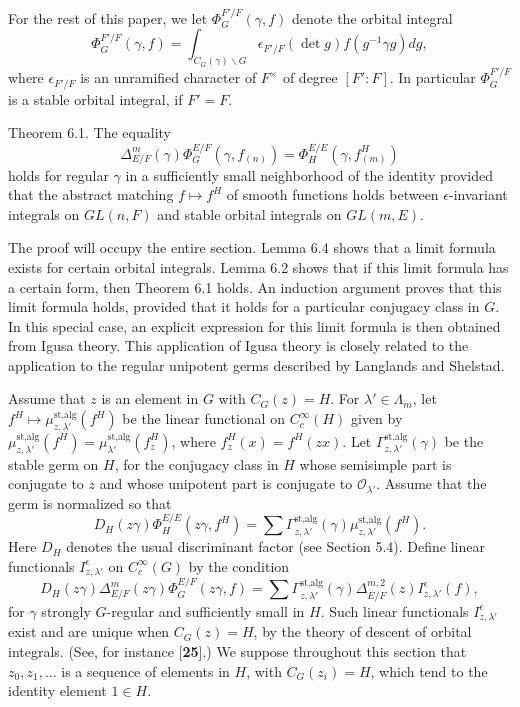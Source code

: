 \documentclass{amsart}
\begin{document}
\medskip
\noindent

For the rest of this paper, we let 
  $ \Phi_G^{F'\!/F}(\gamma,f)$
denote the orbital integral
%
$$
  \Phi_G^{F'\!/F}
  (\gamma,f) =
  \int_{ C_G(\gamma) \backslash G }
  \epsilon_{F'\!/F}
  (\det g) f (g^{-1} \gamma g) dg,
$$
%
where
  $ \epsilon_{F'\!/F} $
is an unramified character of $F^\times$ of degree
  $ [F':F] $.
In particular
  $ \Phi_{G}^{F'\!/F}$
is a stable orbital integral, if $F'=F$.


\medskip
\noindent
\proclaim Theorem {6.1}.
The equality
%
$$
  \Delta_{E/F}^m 
  (\gamma) \Phi_G^{E/F}
  (\gamma, f_{(n)}) =
  \Phi_H^{E/E} (\gamma, f^H_{(m)} )
$$
%
holds for regular
  $ \gamma $
in a sufficiently small neighborhood of the identity provided
  that the abstract matching
  $ f \mapsto f^H $
of smooth functions holds between
  $ \epsilon $-invariant integrals on
  $ GL(n,F) $
and stable orbital integrals on 
  $ GL(m,E) $.
\finishproclaim

The proof will occupy the entire section.  Lemma 6.4 shows that a limit formula
exists for certain orbital integrals.  Lemma 6.2 shows that if this limit formula has
a certain form, then Theorem 6.1 holds.  An induction argument proves that this
limit formula holds, provided that it holds for a particular conjugacy class in $G$.
In this special case, an explicit expression for this limit
formula is then obtained from Igusa theory.  This application of Igusa theory 
is closely related to the application to the regular unipotent germs described
by Langlands and Shelstad.  

Assume that $z$ is an element in $G$ with $C_G(z) = H$.  For $\lambda'\in\Lambda_m$,
let $f^H\mapsto \mu_{z,\lambda'}^{\text{st,alg}}(f^H)$ be the linear
functional on $C_c^\infty(H)$ given by 
	$\mu_{z,\lambda'}^{\text{st,alg}}(f^H)=
\mu_{\lambda'}^{\text{st,alg}}(f^H_z)$, where $f^H_z(x) = f^H(zx)$.
Let $\Gamma^{\text{st,alg}}_{z,\lambda'}(\gamma)$ be the stable germ
on $H$, for the conjugacy class in $H$ whose semisimple part is
conjugate to $z$ and whose unipotent part is conjugate
to ${\mathcal O}_{\lambda'}$.  Assume that the germ is normalized
so that
$$D_H(z\gamma)\Phi^{E/E}_H(z\gamma,f^H) = \sum \Gamma^{\text{st,alg}}_{z,\lambda'}
(\gamma)\mu_{z,\lambda'}^{\text{st,alg}}(f^H).$$
Here $D_H$ denotes the usual discriminant factor (see Section 5.4).
Define linear functionals $I^{\epsilon}_{z,\lambda'}$ on 
$C_c^\infty(G)$ by the condition
$$D_H(z\gamma)\Delta^m_{E/F}(z\gamma)\Phi^{E/F}_G(z\gamma,f) = 
	\sum\Gamma^{\text{st,alg}}_{z,\lambda'}(\gamma)\Delta^{m,2}_{E/F}(z)
	I^{\epsilon}_{z,\lambda'}(f),$$
for $\gamma$ strongly $G$-regular and sufficiently small in $H$.
Such linear functionals $I^{\epsilon}_{z,\lambda'}$ exist
and are unique when $C_G(z) = H$, by the theory of descent of
orbital integrals.  (See, for instance [{\bf 25}].)
We suppose throughout this section that $z_0,z_1,\ldots$ is a sequence
of elements in $H$, with $C_G(z_i) = H$, which tend to the identity
element $1\in H$.  
\end{document}
